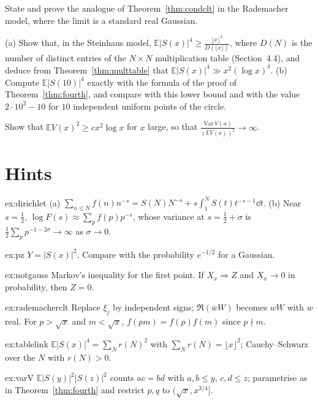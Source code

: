 \begin{exercise}[$\star\star$]\label{ex:rademacherclt}
State and prove the analogue of Theorem~\ref{thm:condclt} in the Rademacher model, where the limit is a standard real Gaussian.
\end{exercise}

\begin{exercise}[$\star$]\label{ex:tablelink}
(a) Show that, in the Steinhaus model, $\mathbb E|S(x)|^4\ge\frac{\lfloor x\rfloor^4}{D(\lfloor x\rfloor)}$, where $D(N)$ is the number of distinct entries of the $N\times N$ multiplication table (Section~4.4), and deduce from Theorem~\ref{thm:multtable} that $\mathbb E|S(x)|^4\gg x^2(\log x)^\delta$. (b) Compute $\mathbb E|S(10)|^4$ exactly with the formula of the proof of Theorem~\ref{thm:fourth}, and compare with this lower bound and with the value $2\cdot10^2-10$ for $10$ independent uniform points of the circle.
\end{exercise}

\begin{exercise}[$\star\star\star$]\label{ex:varV}
Show that $\mathbb EV(x)^2\ge cx^2\log x$ for $x$ large, so that $\frac{\mathrm{Var}\,V(x)}{(\mathbb EV(x))^2}\to\infty$.
\end{exercise}

\section{Hints}

\begin{hint}{ex:dirichlet}
(a) $\sum_{n\le N}f(n)n^{-s}=S(N)N^{-s}+s\int_1^NS(t)t^{-s-1}\dd t$. (b) Near $s=\frac12$, $\log F(s)\approx\sum_pf(p)p^{-s}$, whose variance at $s=\frac12+\sigma$ is $\frac12\sum_pp^{-1-2\sigma}\to\infty$ as $\sigma\to0$.
\end{hint}
\begin{hint}{ex:pz}
$Y=|S(x)|^2$. Compare with the probability $e^{-1/2}$ for a Gaussian.
\end{hint}
\begin{hint}{ex:notgauss}
Markov's inequality for the first point. If $X_x\Rightarrow Z$ and $X_x\to0$ in probability, then $Z=0$.
\end{hint}
\begin{hint}{ex:rademacherclt}
Replace $\xi_j$ by independent signs; $\Re(\overline wW)$ becomes $wW$ with $w$ real. For $p>\sqrt x$ and $m<\sqrt x$, $f(pm)=f(p)f(m)$ since $p\nmid m$.
\end{hint}
\begin{hint}{ex:tablelink}
$\mathbb E|S(x)|^4=\sum_Nr(N)^2$ with $\sum_Nr(N)=\lfloor x\rfloor^2$; Cauchy--Schwarz over the $N$ with $r(N)>0$.
\end{hint}
\begin{hint}{ex:varV}
$\mathbb E|S(y)|^2|S(z)|^2$ counts $ac=bd$ with $a,b\le y$, $c,d\le z$; parametrise as in Theorem~\ref{thm:fourth} and restrict $p,q$ to $(\sqrt x,x^{3/4}]$.
\end{hint}

